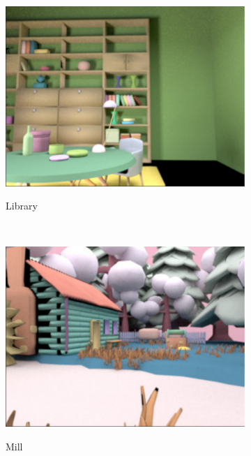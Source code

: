 \documentclass{jov}
\begin{document}
\begin{figure}
\centering
\begin{subfigure}[b]{0.22 \textwidth}
        \caption{Library }
        \includegraphics[width=\textwidth]{../FiguresDraft5/Figure2/Figure2_a.pdf}
        \label{fig:baseSceneLibrary}
    \end{subfigure}
    ~
    \begin{subfigure}[b]{0.22 \textwidth}
        \caption{Mill}    
        \includegraphics[width=\textwidth]{../FiguresDraft5/Figure2/Figure2_b.pdf}
        \label{fig:baseSceneMill}
    \end{subfigure}    
    ~
    \begin{subfigure}[b]{0.22 \textwidth}

\end{subfigure}
\end{figure}
\end{document}
